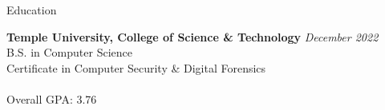 \documentclass{resume} %
\begin{document}

\begin{rSection}{Education}

{\bf Temple University, College of Science \& Technology} \hfill {\em December 2022}    \\ 
B.S. in Computer Science                                                                \\
Certificate in Computer Security \& Digital Forensics                                   \\
\smallskip                                                                              \\
Overall GPA: 3.76

\end{rSection}

\end{document}
